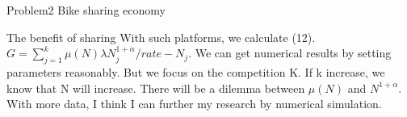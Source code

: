 \documentclass[letterpaper,12pt]{article}
\begin{document}
\begin{section}{Problem2 Bike sharing economy}
\begin{subsection}{The benefit of sharing}
    With such platforms, we calculate (12). $G = \sum\limits_{j=1}^k\mu(N)\lambda N_j^{1+\alpha}/rate-N_j$. We can get numerical results by setting parameters reasonably. But we focus on the competition K. If k increase, we know that N will increase. There will be a dilemma between $\mu(N)$ and $N^{1+\alpha}$. With more data, I think I can further my research by numerical simulation.

	 \end{subsection}
 \end{section}


\nocite{Czarnecki2015}
\nocite{Auer2002Finite}
\end{document}
